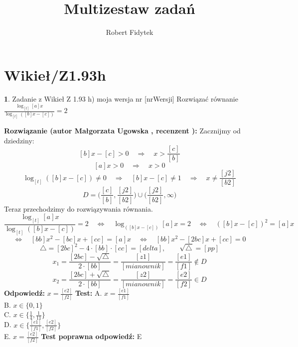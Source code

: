 \documentclass[12pt, a4paper]{article}
\title{Multizestaw zadań}
\author{Robert Fidytek}
\date{}
\theoremstyle{definition} %
\newtheorem{zad}{}
\newcommand{\kategoria}[1]{\section{#1}} %
\newcommand{\zadStart}[1]{\begin{zad}#1\newline} %
\newcommand{\zadStop}{\end{zad}}   %
\newcommand{\rozwStart}[2]{\noindent \textbf{Rozwiązanie (autor #1 , recenzent #2): }\newline} %
\newcommand{\rozwStop}{\newline}                                            %
\newcommand{\odpStart}{\noindent \textbf{Odpowiedź:}\newline}    %
\newcommand{\odpStop}{\newline}                                             %
\newcommand{\testStart}{\noindent \textbf{Test:}\newline} %
\newcommand{\testStop}{\newline} %
\newcommand{\kluczStart}{\noindent \textbf{Test poprawna odpowiedź:}\newline} %
\newcommand{\kluczStop}{\newline} %
\begin{document}
\maketitle


\kategoria{Wikieł/Z1.93h}
\zadStart{Zadanie z Wikieł Z 1.93 h) moja wersja nr [nrWersji]}
Rozwiązać równanie $\frac{\log_{[t]}{[a]x}}{\log_{[t]}{([b]x-[c])}}= 2$
\zadStop
\rozwStart{Małgorzata Ugowska}{}
Zacznijmy od dziedziny:
$$[b]x-[c]>0 \quad \Longrightarrow \quad x>\frac{[c]}{[b]}$$
$$[a]x>0 \quad \Longrightarrow \quad x>0$$
$$\log_{[t]}{([b]x-[c])} \ne 0 \quad \Longrightarrow \quad [b]x-[c] \ne 1 \quad \Longrightarrow \quad x \ne \frac{[j2]}{[b2]}$$
$$D = \Big(\frac{[c]}{[b]}, \frac{[j2]}{[b2]}\Big) \cup \Big(\frac{[j2]}{[b2]}, \infty) $$
Teraz przechodzimy do rozwiązywania równania.
$$ \frac{\log_{[t]}{[a]x}}{\log_{[t]}{([b]x-[c])}}= 2 \quad \Longleftrightarrow \quad \log_{([b]x-[c])}{[a]x}= 2 \quad \Longleftrightarrow \quad ([b]x-[c])^2=[a]x$$
$$\Longleftrightarrow \quad [bb] x^2 - [bc]x + [cc] = [a] x \quad \Longleftrightarrow \quad [bb] x^2 - [2bc]x + [cc] = 0 $$
$$ \bigtriangleup = [2bc]^2 - 4 \cdot [bb] \cdot [cc] = [delta], \qquad \sqrt{\bigtriangleup} = [pp]$$
$$ x_1=\frac{[2bc] -\sqrt{\bigtriangleup}}{2 \cdot [bb]} = \frac{[z1]}{[mianownik]} = \frac{[e1]}{[f1]} \notin D$$
$$ x_2=\frac{[2bc]+\sqrt{\bigtriangleup}}{2 \cdot [bb]} = \frac{[z2]}{[mianownik]} = \frac{[e2]}{[f2]} \in D$$
\rozwStop
\odpStart
$x = \frac{[e2]}{[f2]}$
\odpStop
\testStart
A. $x = \frac{[e1]}{[f1]}$\\
B. $x \in \{0, 1\}$\\
C. $x \in \{\frac{1}{4}, \frac{1}{11}\}$\\
D. $x \in \{\frac{[e1]}{[f1]}, \frac{[e2]}{[f2]}\}$\\
E. $x = \frac{[e2]}{[f2]}$
\testStop
\kluczStart
E
\kluczStop
\end{document}
